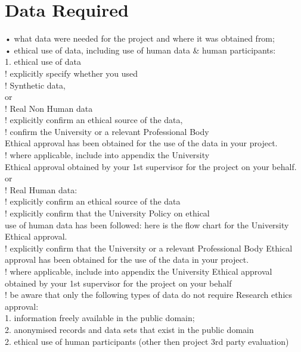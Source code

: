 \chapter{Data Required}
\label{ch:data-required}

• what data were needed for the project and where it was obtained from; \\
• ethical use of data, including use of human data & human participants: \\
1. ethical use of data \\
! explicitly specify whether you used \\
! Synthetic data, \\
or \\
! Real Non Human data \\
! explicitly confirm an ethical source of the data, \\
! confirm the University or a relevant Professional Body \\
Ethical approval has been obtained for the use of the
data in your project. \\
! where applicable, include into appendix the University \\
Ethical approval obtained by your 1st supervisor for the
project on your behalf. \\
or \\
! Real Human data: \\
! explicitly confirm an ethical source of the data \\
! explicitly confirm that the University Policy on ethical \\
use of human data has been followed: here is the flow
chart for the University Ethical approval. \\
! explicitly confirm that the University or a relevant
Professional Body Ethical approval has been obtained
for the use of the data in your project. \\
! where applicable, include into appendix the University
Ethical approval obtained by your 1st supervisor for the
project on your behalf \\
! be aware that only the following types of data do not require
Research ethics approval: \\
1. information freely available in the public domain; \\
2. anonymised records and data sets that exist in the public
domain \\
2. ethical use of human participants (other then project 3rd party evaluation) \\
